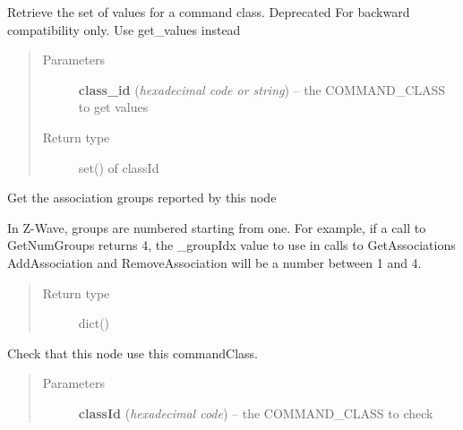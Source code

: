 \documentclass[letterpaper,10pt,english]{sphinxmanual}
\begin{document}
\begin{fulllineitems}
\begin{fulllineitems}
\end{fulllineitems}


\begin{fulllineitems}
\label{node:openzwave.node.ZWaveNode.get_values_for_command_class}
Retrieve the set of values for a command class.
Deprecated
For backward compatibility only.
Use get\_values instead
\begin{quote}\begin{description}
\item[{Parameters}] \leavevmode
\textbf{class\_id} (\emph{hexadecimal code or string}) -- the COMMAND\_CLASS to get values

\item[{Return type}] \leavevmode
set() of classId

\end{description}\end{quote}

\end{fulllineitems}


\begin{fulllineitems}
\label{node:openzwave.node.ZWaveNode.groups}
Get the association groups reported by this node

In Z-Wave, groups are numbered starting from one.  For example, if a call to
GetNumGroups returns 4, the \_groupIdx value to use in calls to GetAssociations
AddAssociation and RemoveAssociation will be a number between 1 and 4.
\begin{quote}\begin{description}
\item[{Return type}] \leavevmode
dict()

\end{description}\end{quote}

\end{fulllineitems}


\begin{fulllineitems}
\label{node:openzwave.node.ZWaveNode.has_command_class}
Check that this node use this commandClass.
\begin{quote}\begin{description}
\item[{Parameters}] \leavevmode
\textbf{classId} (\emph{hexadecimal code}) -- the COMMAND\_CLASS to check


\end{description}
\end{quote}
\end{fulllineitems}
\end{fulllineitems}
\end{document}
